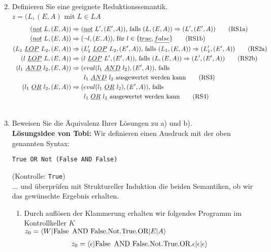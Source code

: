 \documentclass[ngerman,a4paper]{report}
\begin{document}
\begin{enumerate}
\begin{align}
\end{align}
\item Definieren Sie eine geeignete Reduktionssemantik.\\
$z=(L, (E,A)$ mit $L \in LA$
\begin{align}
(\underline{not}\  L,(E,A)) &\Rightarrow (\underline{not}\  L',(E',A))\text{, falls }(L,(E,A)) \Rightarrow (L',(E',A))\tag{RS1a}\\
(\underline{not}\  L,(E,A)) &\Rightarrow (\neg l,(E,A))\text{, für }l\in\{\underline{true},\underline{false}\}\tag{RS1b}\\
(L_1\ \underline{LOP}\ L_2,(E,A)) &\Rightarrow (L_1'\ \underline{LOP}\ L_2,(E',A))\text{, falls }(L_1,(E,A)) \Rightarrow (L_1',(E',A))\tag{RS2a}\\
(l\ \underline{LOP}\ L,(E,A)) &\Rightarrow (l\ \underline{LOP}\ L',(E',A))\text{, falls }(L,(E,A)) \Rightarrow (L',(E',A))\tag{RS2b}\\
(l_1\ \underline{AND}\ l_2,(E,A)) &\Rightarrow (eval(l_1\ \underline{AND}\ l_2),(E',A))\text{, falls }\notag\\&\quad\quad l_1\ \underline{AND}\ l_2\text{ ausgewertet werden kann}\tag{RS3}\\
(l_1\ \underline{OR}\ l_2,(E,A)) &\Rightarrow (eval(l_1\ \underline{OR}\ l_2),(E',A))\text{, falls }\notag\\&\quad\quad l_1\ \underline{OR}\ l_2\text{ ausgewertet werden kann}\tag{RS4}\\ \notag
\end{align}
\item Beweisen Sie die Äquivalenz Ihrer Lösungen zu a) und b).\\
\textbf{Lösungsidee von Tobi:}
Wir definieren einen Ausdruck mit der oben genannten Syntax:
\begin{lstlisting}
True OR Not (False AND False)
\end{lstlisting}
(Kontrolle: \lstinline!True!)\\
... und überprüfen mit Struktureller Induktion die beiden Semantiken, ob wir das gewünschte Ergebnis erhalten.
\begin{enumerate}
\item Durch auflösen der Klammerung erhalten wir folgendes Programm im Kontrollkeller $K$\\
$z_0=\langle W|\text{\lstinline!False AND False.Not.True.OR!}|E|A\rangle$
\begin{align*}
z_0&=\langle \epsilon|\text{\lstinline!False AND False.Not.True.OR!}.\epsilon|\epsilon|\epsilon\rangle \\

\end{align*}
\end{enumerate}
\end{enumerate}
\end{document}
